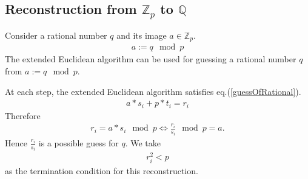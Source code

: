 \documentclass[11pt]{book}
\begin{document}
\subsection{Reconstruction from $\mathbb{Z}_p$ to $\mathbb{Q}$}
Consider a rational number $q$ and its image $a \in \mathbb{Z}_p$.
\begin{eqnarray}
a := q \mod p
\end{eqnarray}
The extended Euclidean algorithm can be used for guessing a rational number $q$ from $a := q \mod p$.

At each step, the extended Euclidean algorithm satisfies eq.(\ref{guessOfRational}).
\begin{eqnarray}
a*s_i + p*t_i = r_i
\end{eqnarray}
Therefore
\begin{eqnarray}
r_i = a*s_i \mod p \Leftrightarrow \frac{r_i}{s_i} \mod p = a.
\end{eqnarray}
Hence $\frac{r_i}{s_i}$ is a possible guess for $q$.
We take
\begin{eqnarray}
r_i^2 < p
\end{eqnarray}
as the termination condition for this reconstruction.
\end{document}
